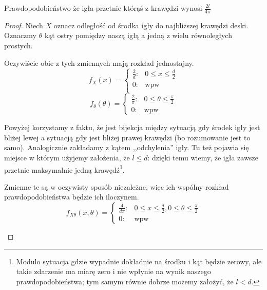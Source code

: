 \begin{theorem}
    Prawdopodobieństwo że igła przetnie którąś z krawędzi wynosi \(\frac{2l}{4\pi}\)
\end{theorem}

\begin{proof}
    Niech \(X\) oznacz odległość od środka igły do najbliższej krawędzi deski. Oznaczmy \(\theta\) kąt ostry pomiędzy naszą igłą a jedną z wielu równoległych prostych.
    
    Oczywiście obie z tych zmiennych mają rozkład jednostajny.
    \[
        f_X(x) = 
        \begin{cases}
            \frac{2}{d}: & 0 \leq x \leq \frac{d}{2} \\
            0: & \text{wpw}\\
        \end{cases}
    \]
    \[
        f_\theta(\theta) = 
        \begin{cases}
            \frac{2}{\pi}: & 0 \leq \theta \leq \frac{\pi}{2} \\
            0: & \text{wpw}
        \end{cases}
    \]
    
    Powyżej korzystamy z faktu, że jest bijekcja między sytuacją gdy środek igły jest bliżej lewej a sytuacją gdy jest bliżej prawej krawędzi (bo rozumowanie jest to samo). Analogicznie zakładamy z kątem ,,odchylenia'' igły. Tu też pojawia się miejsce w którym użyjemy założenia, że \( l \leq d\): dzięki temu wiemy, że igła zawsze przetnie maksymalnie jedną krawędź\footnote{Modulo sytuacja gdzie wypadnie dokładnie na środku i kąt będzie zerowy, ale takie zdarzenie ma miarę zero i nie wpłynie na wynik naszego prawdopodobieństwa; tym samym równie dobrze możemy założyć, że \(l < d\).}.
    
    Zmienne te są w oczywisty sposób niezależne, więc ich wspólny rozkład prawdopodobieństwa będzie ich iloczynem.
    \[
        f_{X\theta}(x, \theta) = 
        \begin{cases}
            \frac{4}{d\pi}: & 0 \leq x \leq \frac{d}{2}, 0 \leq \theta \leq \frac{\pi}{2}  \\
            0: & \text{wpw}
        \end{cases}
    \]
   
    
    \begin{center}

\end{center}
\end{proof}
